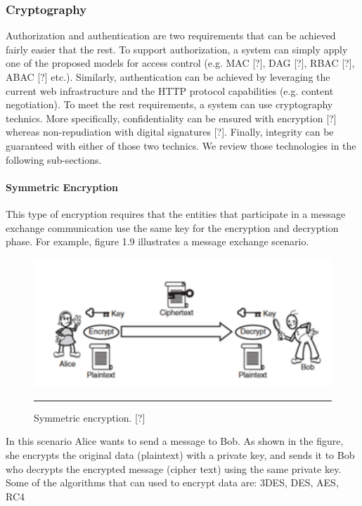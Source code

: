 \subsubsection{Cryptography}

Authorization and authentication are two requirements that can be achieved fairly easier that the rest. To support authorization, a system can simply apply one of the proposed models for access control (e.g. MAC [?], DAG [?], RBAC [?], ABAC [?] etc.). Similarly, authentication can be achieved by leveraging the current web infrastructure and the HTTP protocol capabilities (e.g. content negotiation). To meet the rest requirements, a system can use cryptography technics. More specifically, confidentiality can be ensured with encryption [?] whereas non-repudiation with digital signatures [?]. Finally, integrity can be guaranteed with either of those two technics. We review those technologies in the following sub-sections.

\paragraph{Symmetric Encryption}

This type of encryption requires that the entities that participate in a message exchange communication use the same key for the encryption and decryption phase. For example, figure 1.9 illustrates a message exchange scenario.

\begin{figure}[htbp]
	\centering
		\includegraphics{./Figures/figure12.pdf}
		\rule{35em}{0.5pt}
	\caption[Symmetric Encryption]{Symmetric encryption. [?]}
	\label{fig:symmetricEncryption}
\end{figure}

In this scenario Alice wants to send a message to Bob. As shown in the figure, she encrypts the original data (plaintext) with a private key, and sends it to Bob who decrypts the encrypted message (cipher text) using the same private key. Some of the algorithms that can used to encrypt data are: 3DES, DES, AES, RC4

